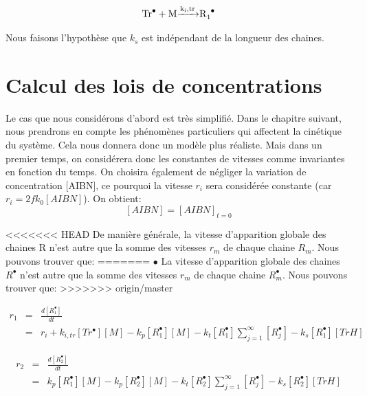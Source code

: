 \documentclass[a4paper,oneside,12pt]{article}
\begin{document}
\begin{equation}
\ce{Tr^{\bullet} + M \xrightarrow{k_i,tr} R_{1}^{\bullet}}
\end{equation}

Nous faisons l'hypothèse que $k_s$ est indépendant de la longueur des chaines.

\section{Calcul des lois de concentrations}
Le cas que nous considérons d'abord est très simplifié. Dans le chapitre suivant, nous prendrons en compte les phénomènes particuliers qui affectent la cinétique du système. Cela nous donnera donc un modèle plus réaliste. Mais dans un premier temps, on considérera donc les constantes de vitesses comme invariantes en fonction du temps. On choisira également de négliger la variation de concentration [AIBN], ce pourquoi la vitesse $r_i$ sera considérée constante (car $r_i=2fk_0[AIBN]$). On obtient:
$$[AIBN]=[AIBN]_{t=0}$$

<<<<<<< HEAD
De manière générale, la vitesse d'apparition globale des chaines R n'est autre que la somme des vitesses $r_{m}$ de chaque chaine $R_{m}$. Nous pouvons trouver que:
=======
$\bullet$ La vitesse d'apparition globale des chaines $R^{\bullet}$ n'est autre que la somme des vitesses $r_{m}$ de chaque chaine $R_{m}^{\bullet}$. Nous pouvons trouver que:
>>>>>>> origin/master

\begin{eqnarray*}
r_{1} &=& \frac{d[R_{1}^{\bullet}]}{dt}\\
      &=& r_{i}+k_{i,tr}[Tr^{\bullet}][M]-k_p[R_{1}^{\bullet}][M]-k_{t}[R_1^{\bullet}]\sum\limits_{j=1}^\infty[R_j^{\bullet}]-k_{s}[R_{1}^{\bullet}][TrH]
\end{eqnarray*}

\begin{eqnarray*}
r_{2} &=& \frac{d[R_{2}^{\bullet}]}{dt}\\
	&=& k_p[R_{1}^{\bullet}][M]-k_p[R_{2}^{\bullet}][M]-k_{t}[R_2^{\bullet}]\sum\limits_{j=1}^\infty[R_j^{\bullet}]-k_{s}[R_{2}^{\bullet}][TrH]
\end{eqnarray*}
\end{document}

